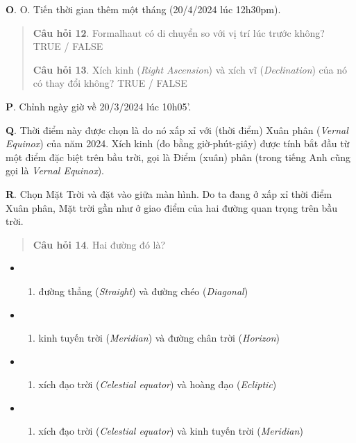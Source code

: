 \documentclass[
]{book}
\providecommand{\tightlist}{%
  \setlength{\itemsep}{0pt}\setlength{\parskip}{0pt}}
\begin{document}
\textbf{O}. O. Tiến thời gian thêm một tháng (20/4/2024 lúc 12h30pm).

\begin{quote}
\textbf{Câu hỏi 12}. Formalhaut có di chuyển so với vị trí lúc trước không?
TRUE / FALSE

\textbf{Câu hỏi 13}. Xích kinh (\emph{Right Ascension}) và xích vĩ (\emph{Declination}) của nó có thay đổi không?
TRUE / FALSE
\end{quote}

\textbf{P}. Chỉnh ngày giờ về 20/3/2024 lúc 10h05'.

\textbf{Q}. Thời điểm này được chọn là do nó xấp xỉ với (thời điểm) Xuân phân (\emph{Vernal Equinox}) của năm 2024. Xích kinh (đo bằng giờ-phút-giây) được tính bắt đầu từ một điểm đặc biệt trên bầu trời, gọi là Điểm (xuân) phân (trong tiếng Anh cũng gọi là \emph{Vernal Equinox}).

\textbf{R}. Chọn Mặt Trời và đặt vào giữa màn hình. Do ta đang ở xấp xỉ thời điểm Xuân phân, Mặt trời gần như ở giao điểm của hai đường quan trọng trên bầu trời.

\begin{quote}
\textbf{Câu hỏi 14}. Hai đường đó là?
\end{quote}

\begin{itemize}
\tightlist
\item
  \begin{enumerate}
  \def\labelenumi{(\Alph{enumi})}
  \tightlist
  \item
    đường thẳng (\emph{Straight}) và đường chéo (\emph{Diagonal})\\
  \end{enumerate}
\item
  \begin{enumerate}
  \def\labelenumi{(\Alph{enumi})}
  \setcounter{enumi}{1}
  \tightlist
  \item
    kinh tuyến trời (\emph{Meridian}) và đường chân trời (\emph{Horizon})\\
  \end{enumerate}
\item
  \begin{enumerate}
  \def\labelenumi{(\Alph{enumi})}
  \setcounter{enumi}{2}
  \tightlist
  \item
    xích đạo trời (\emph{Celestial equator}) và hoàng đạo (\emph{Ecliptic})\\
  \end{enumerate}
\item
  \begin{enumerate}
  \def\labelenumi{(\Alph{enumi})}
  \setcounter{enumi}{3}
  \tightlist
  \item
    xích đạo trời (\emph{Celestial equator}) và kinh tuyến trời (\emph{Meridian})
  \end{enumerate}
\end{itemize}
\end{document}
